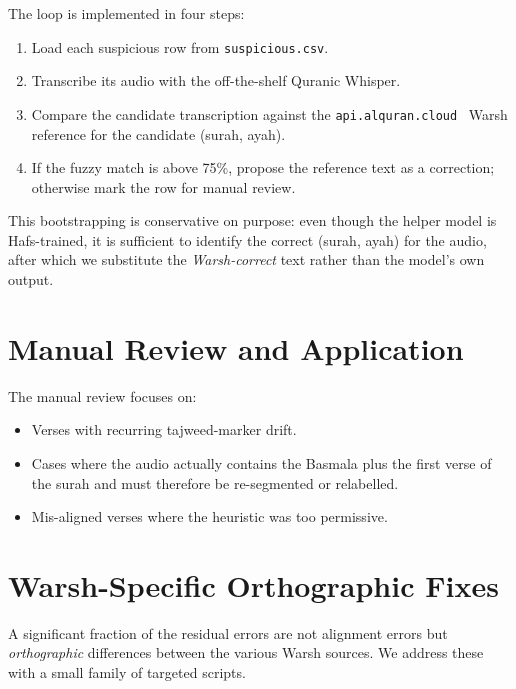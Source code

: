 The loop is implemented in four steps:
\begin{enumerate}
  \item Load each suspicious row from \texttt{suspicious.csv}.
  \item Transcribe its audio with the off-the-shelf Quranic Whisper.
  \item Compare the candidate transcription against the
        \texttt{api.alquran.cloud}~\cite{alqurancloud} Warsh reference
        for the candidate (surah, ayah).
  \item If the fuzzy match is above 75\%, propose the reference text as a
        correction; otherwise mark the row for manual review.
\end{enumerate}

This bootstrapping is conservative on purpose: even though the helper
model is Hafs-trained, it is sufficient to identify the correct
(surah, ayah) for the audio, after which we substitute the
\emph{Warsh-correct} text rather than the model's own output.

\section{Manual Review and Application}


The manual review focuses on:
\begin{itemize}
  \item Verses with recurring tajweed-marker drift.
  \item Cases where the audio actually contains the Basmala plus the
        first verse of the surah and must therefore be re-segmented or
        relabelled.
  \item Mis-aligned verses where the heuristic was too permissive.
\end{itemize}

\section{Warsh-Specific Orthographic Fixes}

A significant fraction of the residual errors are not alignment errors
but \emph{orthographic} differences between the various Warsh sources.
We address these with a small family of targeted scripts.

